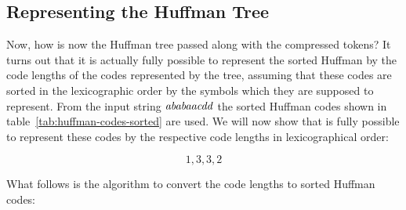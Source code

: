 \subsection{Representing the Huffman Tree}

Now, how is now the Huffman tree passed along with the compressed
tokens? It turns out that it is actually fully possible to represent
the sorted Huffman by the code lengths of the codes represented by the
tree, assuming that these codes are sorted in the lexicographic order
by the symbols which they are supposed to represent. From the input
string $\mathit{ababaacdd}$ the sorted Huffman codes shown in
table~\ref{tab:huffman-codes-sorted} are used. We will now show that
is fully possible to represent these codes by the respective code
lengths in lexicographical order:

\begin{equation*}
  1,3,3,2
\end{equation*}

What follows is the algorithm to convert the code lengths to sorted
Huffman codes:

